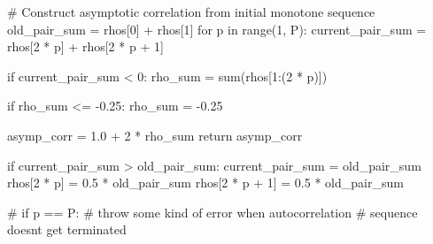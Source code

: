 \documentclass[
  letterpaper,
  DIV=11,
  numbers=noendperiod]{scrartcl}
\newenvironment{Shaded}{\begin{snugshade}}{\end{snugshade}}
\newcommand{\BuiltInTok}[1]{\textcolor[rgb]{0.00,0.23,0.31}{#1}}
\newcommand{\CommentTok}[1]{\textcolor[rgb]{0.37,0.37,0.37}{#1}}
\newcommand{\ControlFlowTok}[1]{\textcolor[rgb]{0.00,0.23,0.31}{#1}}
\newcommand{\DecValTok}[1]{\textcolor[rgb]{0.68,0.00,0.00}{#1}}
\newcommand{\FloatTok}[1]{\textcolor[rgb]{0.68,0.00,0.00}{#1}}
\newcommand{\KeywordTok}[1]{\textcolor[rgb]{0.00,0.23,0.31}{#1}}
\newcommand{\NormalTok}[1]{\textcolor[rgb]{0.00,0.23,0.31}{#1}}
\newcommand{\OperatorTok}[1]{\textcolor[rgb]{0.37,0.37,0.37}{#1}}
\begin{document}
\begin{Shaded}
\begin{Highlighting}[]
  \CommentTok{\# Construct asymptotic correlation from initial monotone sequence}
\NormalTok{  old\_pair\_sum }\OperatorTok{=}\NormalTok{ rhos[}\DecValTok{0}\NormalTok{] }\OperatorTok{+}\NormalTok{ rhos[}\DecValTok{1}\NormalTok{]}
  \ControlFlowTok{for}\NormalTok{ p }\KeywordTok{in} \BuiltInTok{range}\NormalTok{(}\DecValTok{1}\NormalTok{, P):}
\NormalTok{    current\_pair\_sum }\OperatorTok{=}\NormalTok{ rhos[}\DecValTok{2} \OperatorTok{*}\NormalTok{ p] }\OperatorTok{+}\NormalTok{ rhos[}\DecValTok{2} \OperatorTok{*}\NormalTok{ p }\OperatorTok{+} \DecValTok{1}\NormalTok{]}
    
    \ControlFlowTok{if}\NormalTok{ current\_pair\_sum }\OperatorTok{\textless{}} \DecValTok{0}\NormalTok{:}
\NormalTok{      rho\_sum }\OperatorTok{=} \BuiltInTok{sum}\NormalTok{(rhos[}\DecValTok{1}\NormalTok{:(}\DecValTok{2} \OperatorTok{*}\NormalTok{ p)])}
      
      \ControlFlowTok{if}\NormalTok{ rho\_sum }\OperatorTok{\textless{}=} \OperatorTok{{-}}\FloatTok{0.25}\NormalTok{:}
\NormalTok{        rho\_sum }\OperatorTok{=} \OperatorTok{{-}}\FloatTok{0.25}
      
\NormalTok{      asymp\_corr }\OperatorTok{=} \FloatTok{1.0} \OperatorTok{+} \DecValTok{2} \OperatorTok{*}\NormalTok{ rho\_sum}
      \ControlFlowTok{return}\NormalTok{ asymp\_corr}
    
    \ControlFlowTok{if}\NormalTok{ current\_pair\_sum }\OperatorTok{\textgreater{}}\NormalTok{ old\_pair\_sum:}
\NormalTok{      current\_pair\_sum }\OperatorTok{=}\NormalTok{ old\_pair\_sum}
\NormalTok{      rhos[}\DecValTok{2} \OperatorTok{*}\NormalTok{ p]     }\OperatorTok{=} \FloatTok{0.5} \OperatorTok{*}\NormalTok{ old\_pair\_sum}
\NormalTok{      rhos[}\DecValTok{2} \OperatorTok{*}\NormalTok{ p }\OperatorTok{+} \DecValTok{1}\NormalTok{] }\OperatorTok{=} \FloatTok{0.5} \OperatorTok{*}\NormalTok{ old\_pair\_sum}
    
    \CommentTok{\# if p == P:}
      \CommentTok{\# throw some kind of error when autocorrelation}
      \CommentTok{\# sequence doesn\textquotesingle{}t get terminated}
    
\end{Highlighting}
\end{Shaded}
\end{document}
